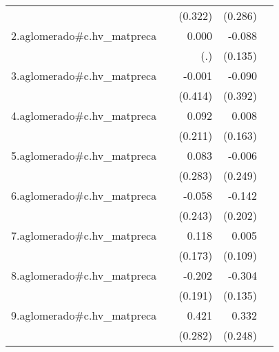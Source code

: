 {\begin{longtable}{l*{4}{D{.}{.}{-1}}}
            &                     &     (0.322)         &     (0.286)         &                     \\
\addlinespace
2.aglomerado#c.hv\_matpreca&                     &       0.000         &      -0.088         &                     \\
            &                     &         (.)         &     (0.135)         &                     \\
\addlinespace
3.aglomerado#c.hv\_matpreca&                     &      -0.001         &      -0.090         &                     \\
            &                     &     (0.414)         &     (0.392)         &                     \\
\addlinespace
4.aglomerado#c.hv\_matpreca&                     &       0.092         &       0.008         &                     \\
            &                     &     (0.211)         &     (0.163)         &                     \\
\addlinespace
5.aglomerado#c.hv\_matpreca&                     &       0.083         &      -0.006         &                     \\
            &                     &     (0.283)         &     (0.249)         &                     \\
\addlinespace
6.aglomerado#c.hv\_matpreca&                     &      -0.058         &      -0.142         &                     \\
            &                     &     (0.243)         &     (0.202)         &                     \\
\addlinespace
7.aglomerado#c.hv\_matpreca&                     &       0.118         &       0.005         &                     \\
            &                     &     (0.173)         &     (0.109)         &                     \\
\addlinespace
8.aglomerado#c.hv\_matpreca&                     &      -0.202         &      -0.304\sym{*}  &                     \\
            &                     &     (0.191)         &     (0.135)         &                     \\
\addlinespace
9.aglomerado#c.hv\_matpreca&                     &       0.421         &       0.332         &                     \\
            &                     &     (0.282)         &     (0.248)         &                     \\

\end{longtable}}
